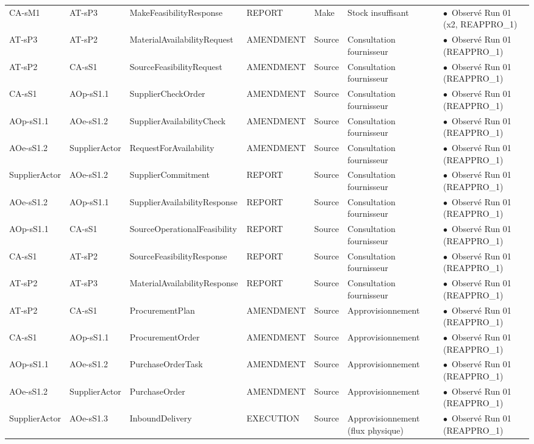 \documentclass[11pt,a4paper]{article}
\newcommand{\stRUN}{\ensuremath{\bullet}~Observé Run 01}
\begin{document}
\begin{landscape}
{\begin{longtable}{p{2.9cm}p{2.9cm}p{5.6cm}p{2.1cm}p{1.4cm}p{2.6cm}p{2.6cm}}
CA-sM1 & AT-sP3 & \mbox{MakeFeasibilityResponse} & REPORT & Make & Stock insuffisant & \stRUN{} (x2, REAPPRO\_1) \\
AT-sP3 & AT-sP2 & \mbox{MaterialAvailabilityRequest} & AMENDMENT & Source & Consultation fournisseur & \stRUN{} (REAPPRO\_1) \\
AT-sP2 & CA-sS1 & \mbox{SourceFeasibilityRequest} & AMENDMENT & Source & Consultation fournisseur & \stRUN{} (REAPPRO\_1) \\
CA-sS1 & AOp-sS1.1 & \mbox{SupplierCheckOrder} & AMENDMENT & Source & Consultation fournisseur & \stRUN{} (REAPPRO\_1) \\
AOp-sS1.1 & AOe-sS1.2 & \mbox{SupplierAvailabilityCheck} & AMENDMENT & Source & Consultation fournisseur & \stRUN{} (REAPPRO\_1) \\
AOe-sS1.2 & SupplierActor & \mbox{RequestForAvailability} & AMENDMENT & Source & Consultation fournisseur & \stRUN{} (REAPPRO\_1) \\
SupplierActor & AOe-sS1.2 & \mbox{SupplierCommitment} & REPORT & Source & Consultation fournisseur & \stRUN{} (REAPPRO\_1) \\
AOe-sS1.2 & AOp-sS1.1 & \mbox{SupplierAvailabilityResponse} & REPORT & Source & Consultation fournisseur & \stRUN{} (REAPPRO\_1) \\
AOp-sS1.1 & CA-sS1 & \mbox{SourceOperationalFeasibility} & REPORT & Source & Consultation fournisseur & \stRUN{} (REAPPRO\_1) \\
CA-sS1 & AT-sP2 & \mbox{SourceFeasibilityResponse} & REPORT & Source & Consultation fournisseur & \stRUN{} (REAPPRO\_1) \\
AT-sP2 & AT-sP3 & \mbox{MaterialAvailabilityResponse} & REPORT & Source & Consultation fournisseur & \stRUN{} (REAPPRO\_1) \\
AT-sP2 & CA-sS1 & \mbox{ProcurementPlan} & AMENDMENT & Source & Approvisionnement & \stRUN{} (REAPPRO\_1) \\
CA-sS1 & AOp-sS1.1 & \mbox{ProcurementOrder} & AMENDMENT & Source & Approvisionnement & \stRUN{} (REAPPRO\_1) \\
AOp-sS1.1 & AOe-sS1.2 & \mbox{PurchaseOrderTask} & AMENDMENT & Source & Approvisionnement & \stRUN{} (REAPPRO\_1) \\
AOe-sS1.2 & SupplierActor & \mbox{PurchaseOrder} & AMENDMENT & Source & Approvisionnement & \stRUN{} (REAPPRO\_1) \\
SupplierActor & AOe-sS1.3 & \mbox{InboundDelivery} & EXECUTION & Source & Approvisionnement (flux physique) & \stRUN{} (REAPPRO\_1) \\

\end{longtable}}
\end{landscape}
\end{document}

